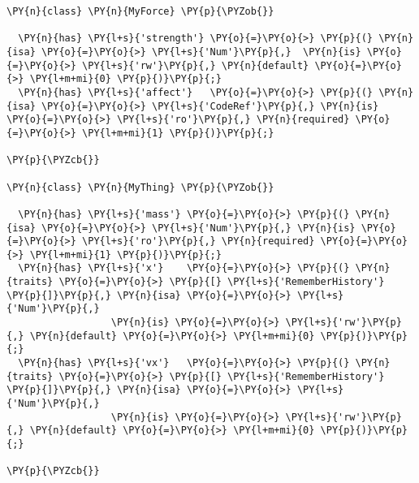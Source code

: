 \begin{Verbatim}[commandchars=\\\{\}]
\PY{n}{class} \PY{n}{MyForce} \PY{p}{\PYZob{}}

  \PY{n}{has} \PY{l+s}{'strength'} \PY{o}{=}\PY{o}{>} \PY{p}{(} \PY{n}{isa} \PY{o}{=}\PY{o}{>} \PY{l+s}{'Num'}\PY{p}{,}  \PY{n}{is} \PY{o}{=}\PY{o}{>} \PY{l+s}{'rw'}\PY{p}{,} \PY{n}{default} \PY{o}{=}\PY{o}{>} \PY{l+m+mi}{0} \PY{p}{)}\PY{p}{;}
  \PY{n}{has} \PY{l+s}{'affect'}   \PY{o}{=}\PY{o}{>} \PY{p}{(} \PY{n}{isa} \PY{o}{=}\PY{o}{>} \PY{l+s}{'CodeRef'}\PY{p}{,} \PY{n}{is} \PY{o}{=}\PY{o}{>} \PY{l+s}{'ro'}\PY{p}{,} \PY{n}{required} \PY{o}{=}\PY{o}{>} \PY{l+m+mi}{1} \PY{p}{)}\PY{p}{;}
  
\PY{p}{\PYZcb{}}

\PY{n}{class} \PY{n}{MyThing} \PY{p}{\PYZob{}}

  \PY{n}{has} \PY{l+s}{'mass'} \PY{o}{=}\PY{o}{>} \PY{p}{(} \PY{n}{isa} \PY{o}{=}\PY{o}{>} \PY{l+s}{'Num'}\PY{p}{,} \PY{n}{is} \PY{o}{=}\PY{o}{>} \PY{l+s}{'ro'}\PY{p}{,} \PY{n}{required} \PY{o}{=}\PY{o}{>} \PY{l+m+mi}{1} \PY{p}{)}\PY{p}{;}
  \PY{n}{has} \PY{l+s}{'x'}    \PY{o}{=}\PY{o}{>} \PY{p}{(} \PY{n}{traits} \PY{o}{=}\PY{o}{>} \PY{p}{[} \PY{l+s}{'RememberHistory'} \PY{p}{]}\PY{p}{,} \PY{n}{isa} \PY{o}{=}\PY{o}{>} \PY{l+s}{'Num'}\PY{p}{,} 
                  \PY{n}{is} \PY{o}{=}\PY{o}{>} \PY{l+s}{'rw'}\PY{p}{,} \PY{n}{default} \PY{o}{=}\PY{o}{>} \PY{l+m+mi}{0} \PY{p}{)}\PY{p}{;}
  \PY{n}{has} \PY{l+s}{'vx'}   \PY{o}{=}\PY{o}{>} \PY{p}{(} \PY{n}{traits} \PY{o}{=}\PY{o}{>} \PY{p}{[} \PY{l+s}{'RememberHistory'} \PY{p}{]}\PY{p}{,} \PY{n}{isa} \PY{o}{=}\PY{o}{>} \PY{l+s}{'Num'}\PY{p}{,}
                  \PY{n}{is} \PY{o}{=}\PY{o}{>} \PY{l+s}{'rw'}\PY{p}{,} \PY{n}{default} \PY{o}{=}\PY{o}{>} \PY{l+m+mi}{0} \PY{p}{)}\PY{p}{;}

\PY{p}{\PYZcb{}}
\end{Verbatim}
